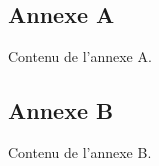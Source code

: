 \newpage
\appendix
\thispagestyle{empty}

\renewcommand{\stctitle}{}                          %
\renewcommand\thesubsection{A\arabic{subsection}}   %
\renewcommand{\stcSSfont}{}                         %

\secttoc


\newpage
\subsection{Annexe A}
Contenu de l'annexe A.

\newpage
\subsection{Annexe B}
Contenu de l'annexe B.
